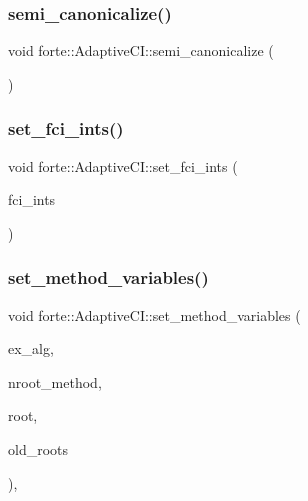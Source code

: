 \subsubsection{\texorpdfstring{semi\+\_\+canonicalize()}{semi\_canonicalize()}}
{\footnotesize\ttfamily void forte\+::\+Adaptive\+C\+I\+::semi\+\_\+canonicalize (\begin{DoxyParamCaption}{ }\end{DoxyParamCaption})}

\mbox{\label{classforte_1_1_adaptive_c_i_a85d46f659801c5b3f9b558c265c90fa7}} 
\subsubsection{\texorpdfstring{set\+\_\+fci\+\_\+ints()}{set\_fci\_ints()}}
{\footnotesize\ttfamily void forte\+::\+Adaptive\+C\+I\+::set\+\_\+fci\+\_\+ints (\begin{DoxyParamCaption}\item[{std\+::shared\+\_\+ptr$<$ \mbox{\hyperlink{classforte_1_1_active_space_integrals}{Active\+Space\+Integrals}} $>$}]{fci\+\_\+ints }\end{DoxyParamCaption})}

\mbox{\label{classforte_1_1_adaptive_c_i_a74874a321e8077f0af18967e9e2ebfd4}} 
\subsubsection{\texorpdfstring{set\+\_\+method\+\_\+variables()}{set\_method\_variables()}}
{\footnotesize\ttfamily void forte\+::\+Adaptive\+C\+I\+::set\+\_\+method\+\_\+variables (\begin{DoxyParamCaption}\item[{std\+::string}]{ex\+\_\+alg,  }\item[{size\+\_\+t}]{nroot\+\_\+method,  }\item[{size\+\_\+t}]{root,  }\item[{const std\+::vector$<$ std\+::vector$<$ std\+::pair$<$ \mbox{\hyperlink{namespaceforte_a2076c63fd7b8732004d9e1442ce527c1}{Determinant}}, double $>$$>$$>$ \&}]{old\+\_\+roots }\end{DoxyParamCaption})\hspace{0.3cm}{\ttfamily [override]}, {\ttfamily [virtual]}}



